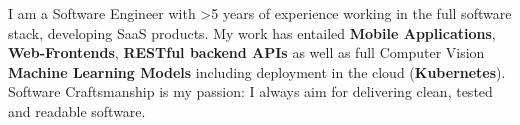 \documentclass[8pt]{developercv} %
\begin{document}
\vspace{0.5cm}



\begin{minipage}[t]{0.4\textwidth} %
	\vspace{-\baselineskip} %
	
	I am a Software Engineer with >5 years of experience working in the full software stack, developing SaaS products.
	My work has entailed \textbf{Mobile Applications}, \textbf{Web-Frontends}, \textbf{RESTful backend APIs} as well as full Computer Vision \textbf{Machine Learning Models} including deployment in the cloud (\textbf{Kubernetes}).
	Software Craftsmanship is my passion: I always aim for delivering clean, tested and readable software.
\end{minipage}
\hfill %
\begin{minipage}[t]{0.5\textwidth} %
	\vspace{-\baselineskip} %
	\begin{barchart}{4.5}
	\end{barchart}
\end{minipage}



\end{document}
